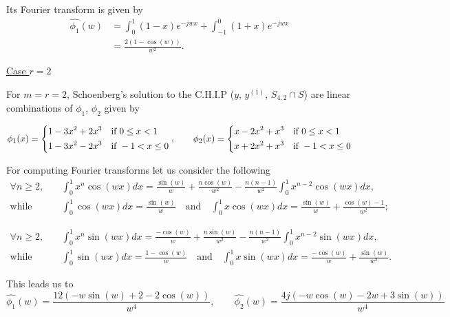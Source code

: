 \documentclass[a4paper, 11pt]{article}
\begin{document}
Its Fourier transform is given by
\begin{align*}
  \hat{\phi_1}(w) &= \int_0^1 (1-x)e^{-jwx} + \int_{-1}^0 (1+x) e^{-jwx} \\
  &= \frac{2(1-\cos(w))}{w^2}.
\end{align*}

\underline{Case $r=2$}

For $m=r=2$, Schoenberg's solution to the C.H.I.P ($y$, $y^{(1)}$, $S_{4, 2} \cap S$) are linear combinations of 
$\phi_1$, $\phi_2$ given by

\begin{equation*}
  \phi_1(x) = \begin{dcases}
    1-3x^2+2x^3 & \text{if } 0 \leq x < 1 \\
    1-3x^2-2x^3 & \text{if } -1 < x \leq 0
  \end{dcases},
  \qquad\hfill
  \phi_2(x) = \begin{dcases}
    x-2x^2+x^3 & \text{if } 0 \leq x < 1 \\
    x+2x^2+x^3 & \text{if } -1 < x \leq 0
  \end{dcases}
\end{equation*}

For computing Fourier transforms let us consider the following
\begin{align*}
  \forall n \geq 2, \quad& \int_0^1 x^n \cos(wx)dx = \frac{\sin(w)}{w} + \frac{n \cos(w)}{w^2} - 
  \frac{n(n-1)}{w^2}\int_0^1 x^{n-2} \cos(wx) dx, \\
  \text{while} \quad& \int_0^1 \cos(wx)dx = \frac{\sin(w)}{w} \quad \text{and} \quad \int_0^1 x\cos(wx)dx = 
  \frac{\sin(w)}{w} + \frac{\cos(w)-1}{w^2};
\end{align*}

\begin{align*}
  \forall n \geq 2, \quad& \int_0^1 x^n \sin(wx)dx = \frac{-\cos(w)}{w} + \frac{n \sin(w)}{w^2} - 
  \frac{n(n-1)}{w^2}\int_0^1 x^{n-2} \sin(wx) dx, \\
  \text{while} \quad& \int_0^1 \sin(wx)dx = \frac{1-\cos(w)}{w} \quad \text{and} \quad \int_0^1 x\sin(wx)dx = 
  \frac{-\cos(w)}{w} + \frac{\sin(w)}{w^2}.
\end{align*}

This leads us to
\begin{equation}
  \hat{\phi_1}(w) = \frac{12(-w\sin(w) + 2 - 2\cos(w))}{w^4}, \qquad \hat{\phi_2}(w) = \frac{4j(-w\cos(w) - 2w +
  3\sin(w) )}{w^4}
\end{equation}
\end{document}
